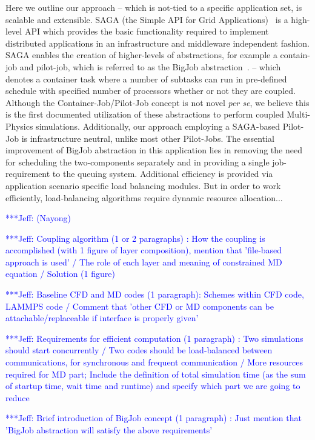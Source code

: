 \documentclass[times, 10pt,twocolumn]{article}
\newcommand{\skonote}[1]{ {\textcolor{blue} { ***Jeff: #1 }}}
\newcommand{\skonote}[1]{}
\begin{document}
Here we outline our approach -- which is not-tied to a specific application set, is scalable and extensible. SAGA (the Simple API for Grid Applications)~\cite{Jha:2008} is a high-level API which provides the basic functionality required to implement distributed applications in an infrastructure and middleware independent fashion.  SAGA enables the creation of higher-levels of abstractions, for example a contain-job and pilot-job, which is referred to as the BigJob abstraction~\cite{Jha:2009}.  -- which denotes a container task where a number of subtasks can run in pre-defined schedule with specified number of processors whether or not they are coupled.  Although the Container-Job/Pilot-Job concept is not novel {\it per se}, we believe this is the first documented utilization of these abstractions to perform coupled Multi-Physics simulations. Additionally, our approach employing a SAGA-based Pilot-Job is infrastructure neutral, unlike most other Pilot-Jobs.  The essential improvement of BigJob abstraction in this application lies in removing the need for scheduling the two-components separately and in providing a single job-requirement to the queuing system. Additional efficiency is provided via application scenario specific load balancing modules. But in order to work efficiently, load-balancing algorithms require dynamic resource allocation...

\skonote{(Nayong)}

\skonote{Coupling algorithm (1 or 2 paragraphs)
: How the coupling is accomplished (with 1 figure of layer composition), mention that 'file-based approach is used' / The role of each layer and meaning of constrained MD equation / Solution (1 figure)}

\skonote{Baseline CFD and MD codes (1 paragraph): Schemes within CFD code, LAMMPS code / Comment that 'other CFD or MD components can be attachable/replaceable if interface is properly given'}

\skonote{Requirements for efficient computation (1 paragraph)
: Two simulations should start concurrently / Two codes should be load-balanced between communications, for synchronous and frequent communication / More resources required for MD part; Include the definition of total simulation time (as the sum of startup time, wait time and runtime) and specify which part we are going to reduce}

\skonote{Brief introduction of BigJob concept (1 paragraph)
: Just mention that 'BigJob abstraction will satisfy the above requirements'}
\end{document}
